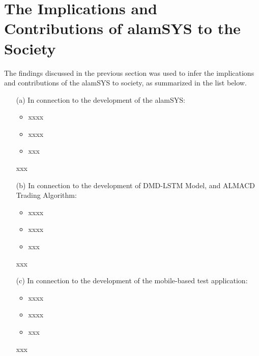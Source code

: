 \section{The Implications and Contributions of alamSYS to the Society}
\label{sec:implications}
The findings discussed in the previous section was used to infer the 
implications and contributions of the alamSYS to society, 
as summarized in the list below.

\begin{itemize}
    \item[(a)] In connection to the development of the alamSYS:
        \begin{itemize}
            \item xxxx
            \item xxxx
            \item xxx
        \end{itemize}
        xxx
        \hfill \\
        
    \item[(b)] In connection to the development of DMD-LSTM Model, and ALMACD Trading Algorithm:
        \begin{itemize}
            \item xxxx
            \item xxxx
            \item xxx
        \end{itemize}
        xxx
        \hfill \\
        
    \item[(c)] In connection to the development of the mobile-based test application:
        \begin{itemize}
            \item xxxx
            \item xxxx
            \item xxx
        \end{itemize}
        xxx
        \hfill \\
        
\end{itemize}